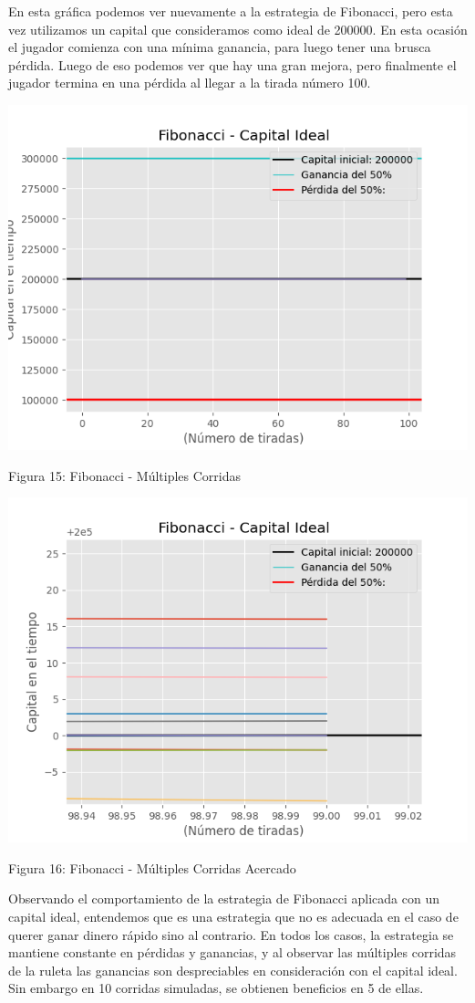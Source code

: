 \documentclass{article}
\begin{document}
En esta gráfica podemos ver nuevamente a la estrategia de Fibonacci, pero esta vez utilizamos un capital que consideramos como ideal de 200000. En esta ocasión el jugador comienza con una mínima ganancia, para luego tener una brusca pérdida. Luego de eso podemos ver que hay una gran mejora, pero finalmente el jugador termina en una pérdida al llegar a la tirada número 100.


\begin{center}
    \includegraphics[width=0.7\linewidth]{FIB-ideal-multiplestiradas(1).png}
    
    \caption{Figura 15: Fibonacci - Múltiples Corridas}
\end{center}

\begin{center}
    \includegraphics[width=0.7\linewidth]{FIB-ideal-multiplestiradas(2).png}
    
    \caption{Figura 16: Fibonacci - Múltiples Corridas Acercado}
\end{center}


Observando el comportamiento de la estrategia de Fibonacci aplicada con un capital ideal, entendemos que es una estrategia que no es adecuada en el caso de querer ganar dinero rápido sino al contrario. En todos los casos, la estrategia se mantiene constante en pérdidas y ganancias, y al observar las múltiples corridas de la ruleta las ganancias son despreciables en consideración con el capital ideal. Sin embargo en 10 corridas simuladas, se obtienen beneficios en 5 de ellas. 
\end{document}
